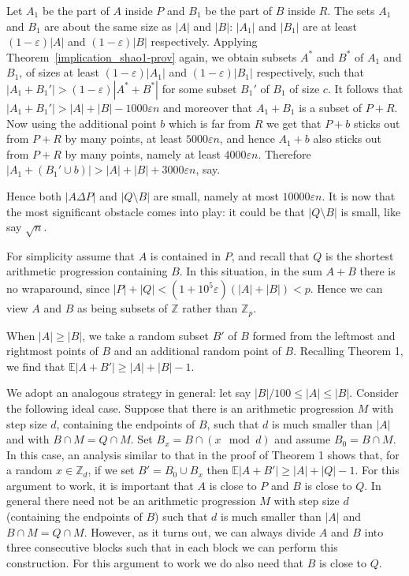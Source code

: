 \documentclass[12pt,reqno]{amsart}
\theoremstyle{definition}
\renewcommand\leq{\leqslant}
\renewcommand\geq{\geqslant}
\renewcommand\ge{\geqslant}
\begin{document}
Let $A_1$ be the part of $A$ inside $P$ and $B_1$ be the part of $B$ inside $R$.
The sets $A_1$ and $B_1$ are about the same size as $|A|$ and $|B|$: $|A_1|$ and $|B_1|$ are at
least $(1 - \varepsilon)|A|$ and $(1 - \varepsilon)|B|$ respectively. 
Applying Theorem~\ref{implication_shao1-prov} again, we obtain subsets $A^*$ and $B^*$ of $A_1$ and
$B_1$, of sizes at least $(1 - \varepsilon)|A_1|$ and $(1 - \varepsilon)|B_1|$ respectively, such that
$| A_1+B_1'| > (1-\varepsilon) |A^*+B^*|$ for some subset $B_1'$ of $B_1$ of size $c$. It
follows that $|A_1+B_1'|> |A|+|B|- 1000 \varepsilon n$ and moreover that $A_1+B_1$ is a
subset of $P+R$. Now using the additional point $b$ which is far from $R$ we
get that $P+b$ sticks out from $P+R$ by many points, at least $5000 \varepsilon n$, and hence
$A_1+b$ also sticks out from $P+R$ by many points, namely at least $4000 \varepsilon n$. 
Therefore
$| A_1+ (B_1' \cup b)| > |A|+|B|+3000 \varepsilon n$, say.

Hence both $|A \Delta P|$ and $|Q \setminus B|$ are small, namely at most
$10000 \varepsilon n$. It is now that the most significant obstacle comes into play:
it could be that $|Q \setminus B|$ is small, like say $\sqrt n$.

For simplicity assume that $A$ is contained in $P$, and recall that $Q$ is the shortest
arithmetic progression containing $B$. In this situation, in the sum $A+B$ there is no wraparound, since
$|P|+|Q|<(1+10^5\varepsilon)(|A|+|B|)<p$. Hence we can view $A$ and $B$ as being
subsets of ${\mathbb Z}$ rather than ${\mathbb Z}_p$.

When $|A| \ge |B|$, we take a random subset $B'$ of $B$ formed from the leftmost and
rightmost points of $B$ and an additional random point of $B$. Recalling Theorem 1,
we find that ${\mathbb E}|A+B'| \geq |A|+|B|-1$.

We adopt an analogous strategy in general: let say
$|B|/100 \leq |A| \leq |B|$. 
Consider the following ideal
case. Suppose that there is an arithmetic progression $M$ with step size $d$, containing the endpoints
of $B$, such that
$d$ is much smaller than $|A|$ and with $B
\cap M = Q \cap M$.  Set $B_x = B \cap (x \mod d)$ and assume $B_0= B
\cap M$.    In this case, an analysis similar to that in the proof of Theorem 1 shows that, for
a random $x \in {\mathbb Z}_d$, if we set $B'=B_0 \cup B_x$ then
${\mathbb E}|A+B'| \ge |A|+|Q|-1$.
For this argument to work, it is important  that $A$ is close to $P$ and $B$ is
close to $Q$. In general there need not be an arithmetic progression $M$ with step size $d$ (containing
the endpoints of $B$) such that
$d$ is much smaller than $|A|$ and $B \cap M = Q \cap M$. However, as it turns out, we can
always
divide $A$ and $B$ into three consecutive blocks such that in each block we can
perform this construction. For this argument to work we do also need that $B$ is
close to $Q$.
\end{document}
